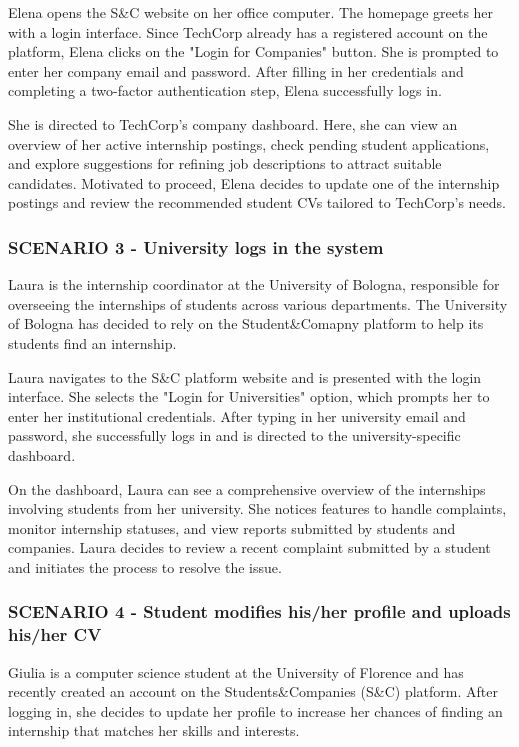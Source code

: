 Elena opens the S\&C website on her office computer. The homepage greets her with a login interface.
Since TechCorp already has a registered account on the platform, Elena clicks on the "Login for
Companies" button. She is prompted to enter her company email and password. After filling in her
credentials and completing a two-factor authentication step, Elena successfully logs in.  

She is directed to TechCorp’s company dashboard. Here, she can view an overview of her active
internship postings, check pending student applications, and explore suggestions for refining
job descriptions to attract suitable candidates. Motivated to proceed, Elena decides to update one
of the internship postings and review the recommended student CVs tailored to TechCorp’s needs.  
\subsubsection{SCENARIO 3 - University logs in the system}
Laura is the internship coordinator at the University of Bologna, responsible for overseeing the
internships of students across various departments. The University of Bologna has decided
to rely on the Student\&Comapny platform to help its students find an internship.

Laura navigates to the S\&C platform website and is presented with the login interface.
She selects the "Login for Universities" option, which prompts her to enter her institutional
credentials. After typing in her university email and password, she successfully logs in and is
directed to the university-specific dashboard.  

On the dashboard, Laura can see a comprehensive overview of the internships involving students
from her university. She notices features to handle complaints, monitor internship statuses, and
view reports submitted by students and companies. Laura decides to review a recent complaint submitted
by a student and initiates the process to resolve the issue.
\subsubsection{SCENARIO 4 - Student modifies his/her profile and uploads his/her CV}
Giulia is a computer science student at the University of Florence and has recently
created an account on the Students\&Companies (S\&C) platform. After logging in, she decides to update her
profile to increase her chances of finding an internship that matches her skills and interests.  

